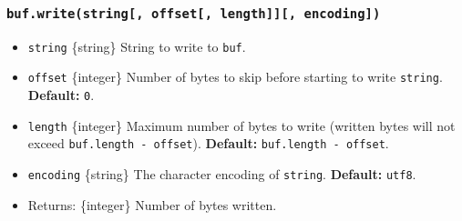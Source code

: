 \begin{Shaded}
\begin{Highlighting}[]
\NormalTok{ \{ }\NormalTok{ \} }\OperatorTok{=} \NormalTok{(}\NormalTok{)}\OperatorTok{;}

\OperatorTok{=} \NormalTok{(}\NormalTok{)}\OperatorTok{;}

\NormalTok{ (}\NormalTok{()) \{}
  \OperatorTok{;}
\NormalTok{\}}

\NormalTok{ (}
  \OperatorTok{;}
\NormalTok{\}}
\end{Highlighting}
\end{Shaded}

\subsubsection{\texorpdfstring{\texttt{buf.write(string{[},\ offset{[},\ length{]}{]}{[},\ encoding{]})}}{buf.write(string{[}, offset{[}, length{]}{]}{[}, encoding{]})}}\label{buf.writestring-offset-length-encoding}

\begin{itemize}
\tightlist
\item
  \texttt{string} \{string\} String to write to \texttt{buf}.
\item
  \texttt{offset} \{integer\} Number of bytes to skip before starting to
  write \texttt{string}. \textbf{Default:} \texttt{0}.
\item
  \texttt{length} \{integer\} Maximum number of bytes to write (written
  bytes will not exceed \texttt{buf.length\ -\ offset}).
  \textbf{Default:} \texttt{buf.length\ -\ offset}.
\item
  \texttt{encoding} \{string\} The character encoding of
  \texttt{string}. \textbf{Default:}
  \texttt{\textquotesingle{}utf8\textquotesingle{}}.
\item
  Returns: \{integer\} Number of bytes written.
\end{itemize}

